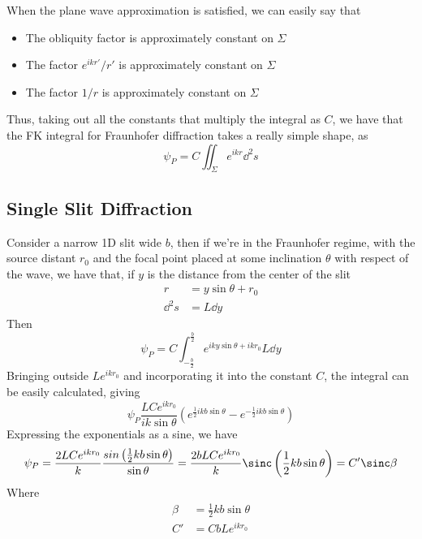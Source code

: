 \documentclass[../electromagnetism.tex]{subfiles}
\begin{document}
When the plane wave approximation is satisfied, we can easily say that
\begin{itemize}
\item The obliquity factor is approximately constant on $\Sigma$
\item The factor $e^{ikr'}/r'$ is approximately constant on $\Sigma$
\item The factor $1/r$ is approximately constant on $\Sigma$
\end{itemize}
Thus, taking out all the constants that multiply the integral as $C$, we have that the FK integral for Fraunhofer diffraction takes a really simple shape, as
\begin{equation}
	\psi_P=C\iint_\Sigma e^{ikr}\dd^2s
	\label{eq:fraunhoferintegral.fradiff}
\end{equation}
\subsection{Single Slit Diffraction}
Consider a narrow 1D slit wide $b$, then if we're in the Fraunhofer regime, with the source distant $r_0$ and the focal point placed at some inclination $\theta$ with respect of the wave, we have that, if $y$ is the distance from the center of the slit
\begin{equation*}
	\begin{aligned}
		r&=y\sin\theta+r_0\\
		\dd^2s&=L\dd y
	\end{aligned}
\end{equation*}
Then
\begin{equation}
	\psi_P=C\int_{-\frac{b}{2}}^{\frac{b}{2}}e^{iky\sin\theta+ikr_0}L\dd^{}{y}
	\label{eq:singleslit.fradiff}
\end{equation}
Bringing outside $Le^{ikr_0}$ and incorporating it into the constant $C$, the integral can be easily calculated, giving
\begin{equation*}
	\psi_P\frac{LCe^{ikr_0}}{ik\sin\theta}\left( e^{\frac{1}{2}ikb\sin\theta}-e^{-\frac{1}{2}ikb\sin\theta} \right)
\end{equation*}
Expressing the exponentials as a sine, we have
\begin{equation}
	\psi_P=\frac{2LCe^{ikr_0}}{k}\frac{sin\left( \frac{1}{2}kb\sin\theta \right)}{\sin\theta}=\frac{2bLCe^{ikr_0}}{k}\sinc\left( \frac{1}{2}kb\sin\theta \right)=C'\sinc\beta
	\label{eq:singleslit.fradiff}
\end{equation}
Where
\begin{equation}
	\begin{aligned}
		\beta&=\frac{1}{2}kb\sin\theta\\
		C'&=CbLe^{ikr_0}
	\end{aligned}
	\label{eq:defconstsingle.fradiff}
\end{equation}
\end{document}
